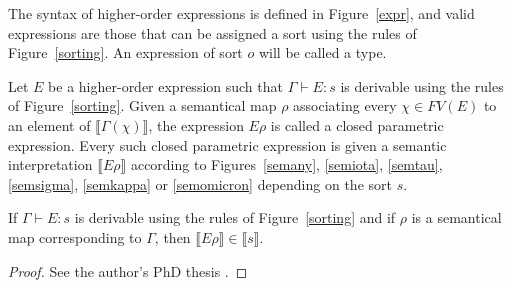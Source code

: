 \begin{definition}
  The syntax of higher-order expressions is defined in Figure~\ref{expr},
  and valid expressions are those that can be assigned a sort using the
  rules of Figure~\ref{sorting}. An expression of sort $o$ will be called
  a type.
\end{definition}

\begin{definition}
  Let $E$ be a higher-order expression such that $\Gamma \vdash E : s$ is
  derivable using the rules of Figure~\ref{sorting}. Given a semantical
  map $\rho$ associating every $\chi \in FV(E)$ to an element of
  $\llbracket \Gamma(\chi) \rrbracket$, the expression $E\rho$ is called
  a closed parametric expression. Every such closed parametric expression is
  given a semantic interpretation $\llbracket E\rho \rrbracket$ according to
  Figures~\ref{semany}, \ref{semiota}, \ref{semtau}, \ref{semsigma},
  \ref{semkappa} or \ref{semomicron} depending on the sort $s$.
\end{definition}

\begin{lemma}
  If $\Gamma \vdash E : s$ is derivable using the rules of
  Figure~\ref{sorting} and if $\rho$ is a semantical map corresponding to
  $\Gamma$, then $\llbracket E\rho \rrbracket \in \llbracket s \rrbracket$.
\end{lemma}
\begin{proof}
  See the author's PhD thesis \cite[Chapter~4]{Lepigre2017PhD}.
\end{proof}

